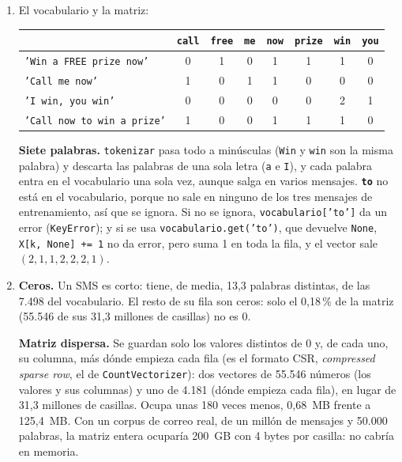 \documentclass{article}
\begin{document}
\begin{enumerate}
    \item[a)] El vocabulario y la matriz:
    \begin{center}
    \small
    \begin{tabular}{lccccccc}
    \toprule
     & \texttt{call} & \texttt{free} & \texttt{me} & \texttt{now} & \texttt{prize} & \texttt{win} & \texttt{you} \\
    \midrule
    \texttt{'Win a FREE prize now'} & 0 & 1 & 0 & 1 & 1 & 1 & 0 \\
    \texttt{'Call me now'} & 1 & 0 & 1 & 1 & 0 & 0 & 0 \\
    \texttt{'I win, you win'} & 0 & 0 & 0 & 0 & 0 & 2 & 1 \\
    \midrule
    \texttt{'Call now to win a prize'} & 1 & 0 & 0 & 1 & 1 & 1 & 0 \\
    \bottomrule
    \end{tabular}
    \end{center}
    \textbf{Siete palabras.} \texttt{tokenizar} pasa todo a minúsculas (\texttt{Win} y \texttt{win} son la misma palabra) y descarta las palabras de una sola letra (\texttt{a} e \texttt{I}), y cada palabra entra en el vocabulario una sola vez, aunque salga en varios mensajes. \textbf{\texttt{to}} no está en el vocabulario, porque no sale en ninguno de los tres mensajes de entrenamiento, así que se ignora. Si no se ignora, \texttt{vocabulario['to']} da un error (\texttt{KeyError}); y si se usa \texttt{vocabulario.get('to')}, que devuelve \texttt{None}, \texttt{X[k, None] += 1} no da error, pero suma 1 en toda la fila, y el vector sale $(2, 1, 1, 2, 2, 2, 1)$.

    \item[b)] \textbf{Ceros.} Un SMS es corto: tiene, de media, 13,3 palabras distintas, de las 7.498 del vocabulario. El resto de su fila son ceros: solo el 0,18\,\% de la matriz (55.546 de sus 31,3 millones de casillas) no es 0.

    \textbf{Matriz dispersa.} Se guardan solo los valores distintos de 0 y, de cada uno, su columna, más dónde empieza cada fila (es el formato CSR, \textit{compressed sparse row}, el de \texttt{CountVectorizer}): dos vectores de 55.546 números (los valores y sus columnas) y uno de 4.181 (dónde empieza cada fila), en lugar de 31,3 millones de casillas. Ocupa unas 180 veces menos, 0,68~MB frente a 125,4~MB. Con un corpus de correo real, de un millón de mensajes y 50.000 palabras, la matriz entera ocuparía 200~GB con 4 bytes por casilla: no cabría en memoria.
\end{enumerate}
\end{document}
